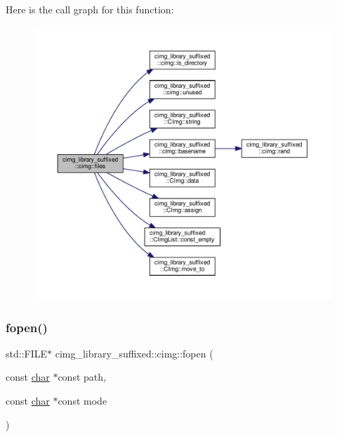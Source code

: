 Here is the call graph for this function\+:
\nopagebreak
\begin{figure}[H]
\begin{center}
\leavevmode
\includegraphics[width=350pt]{d4/d9b/namespacecimg__library__suffixed_1_1cimg_a9f8980f1308177adebab5f8f52a79835_cgraph}
\end{center}
\end{figure}
\mbox{\label{namespacecimg__library__suffixed_1_1cimg_a9aafdb8732ff87625052ce2723f8a516}} 
\subsubsection{\texorpdfstring{fopen()}{fopen()}}
{\footnotesize\ttfamily std\+::\+F\+I\+LE$\ast$ cimg\+\_\+library\+\_\+suffixed\+::cimg\+::fopen (\begin{DoxyParamCaption}\item[{const \hyperlink{classchar}{char} $\ast$const}]{path,  }\item[{const \hyperlink{classchar}{char} $\ast$const}]{mode }\end{DoxyParamCaption})\hspace{0.3cm}{\ttfamily [inline]}}



